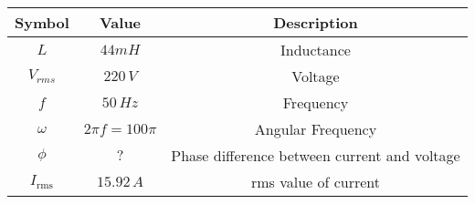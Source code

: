 \begin{tabular}{|c|c|c|}
	\hline
	\textbf{Symbol} & \textbf{Value} &
	\textbf{Description}\\[6pt]
	\hline
	$L$ &  $44mH$ & Inductance\\[6pt]
	\hline 
	$V_{rms}$ & $220\, V$ & Voltage\\[6pt]
	\hline
	$f$ & $50\, {Hz}$ & Frequency\\[6pt]
	\hline
	$\omega$ & $2\pi f=100\pi$ & Angular Frequency\\[6pt]
	\hline
	$\phi$ & $?$ & Phase difference between current and voltage\\[6pt]
	\hline
	$I_ \text{rms}$ & $15.92\, A$ & rms value of current\\
	\hline
\end{tabular}
